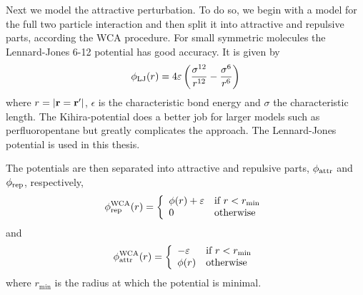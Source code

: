 
Next we model the attractive perturbation. 
To do so, we begin with a model for the full two particle interaction 
and then split it into attractive and repulsive parts, according the WCA procedure.
For small symmetric molecules the Lennard-Jones 6-12 potential has good accuracy.
It is given by
\begin{align}
  \phi_{\textrm{LJ}}(r) = 4\varepsilon\left( \frac{\sigma^{12}}{r^{12}} - \frac{\sigma^{6}}{r^{6}} \right)
  \label{eqn:nuc:LJ}
\end{align}
where $r = \left| \textbf{r}=\textbf{r}^\prime \right|$, $\epsilon$ is the characteristic bond energy 
and $\sigma$ the characteristic length.
The Kihira-potential does a better job for larger models such as perfluoropentane 
but greatly complicates the approach.
The Lennard-Jones potential is used  in this thesis.


The potentials are then separated into attractive and repulsive parts, $\phi_{\text{attr}}$ and $\phi_{\text{rep}}$, respectively,
\begin{align}
  \phi_{\text{rep}}^{\text{WCA}}(r) = \left\{
    \begin{array}{ll}
      \phi(r) +  \varepsilon & \text{if $r<r_{\textrm{min}}$}\\
      0 & \text{otherwise}
    \end{array} \right. 
\end{align}
and 
\begin{align}
  \phi_{\text{attr}}^{\text{WCA}}(r) = \left\{ 
    \begin{array}{ll}
      - \varepsilon & \text{if $r<r_{\textrm{min}}$}\\
      \phi(r) & \text{otherwise}
    \end{array} \right.
\end{align}
where $r_\min$ is the radius at which the potential is minimal.

